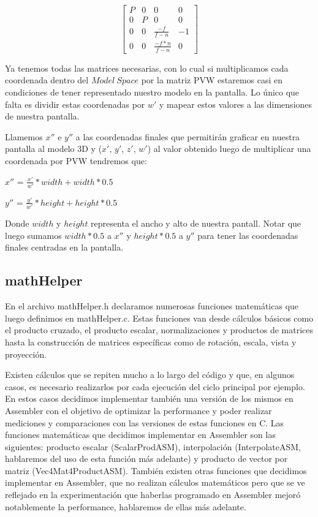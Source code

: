 \documentclass[a4paper]{article}
\begin{document}
\[
\begin{bmatrix}
P & 0 & 0 & 0 \\
0 & P & 0 & 0 \\
0 & 0 & \frac{-f}{f-n} & -1 \\
0 & 0 & \frac{-f*n}{f-n} & 0  
\end{bmatrix}
\]


Ya tenemos todas las matrices necesarias, con lo cual si multiplicamos cada coordenada dentro del $Model \ Space$ por la matriz PVW estaremos casi en condiciones de tener representado nuestro modelo en la pantalla. Lo único que falta es dividir estas coordenadas por $w'$ y mapear estos valores a las dimensiones de nuestra pantalla.\newline


Llamemos $x''$ e $y''$ a las coordenadas finales que permitirán graficar en nuestra pantalla al modelo 3D y ($x'$, $y'$, $z'$, $w'$) al valor obtenido luego de multiplicar una coordenada por PVW tendremos que: \newline

$x''$ = $\frac{x'}{w'}*width +  width*0.5$ \newline

$y''$ = $\frac{y'}{w'}*height +  height*0.5$ \newline

Donde $width$ y $height$ representa el ancho y alto de nuestra pantall. Notar que luego sumamos $width*0.5$ a $x''$ y $height*0.5$ a $y''$ para tener las coordenadas finales centradas en la pantalla.

\subsection{mathHelper}
En el archivo mathHelper.h declaramos numerosas funciones matemáticas que luego definimos en mathHelper.c. Estas funciones van desde cálculos básicos como el producto cruzado, el producto escalar, normalizaciones y productos de matrices hasta la construcción de matrices específicas como de rotación, escala, vista y proyección.
\par Existen cálculos que se repiten mucho a lo largo del código y que, en algunos casos, es necesario realizarlos por cada ejecución del ciclo principal por ejemplo. En estos casos decidimos implementar también una versión de los mismos en Assembler con el objetivo de optimizar la performance y poder realizar mediciones y comparaciones con las versiones de estas funciones en C. Las funciones matemáticas que decidimos implementar en Assembler son las siguientes: producto escalar (ScalarProdASM), interpolación (InterpolateASM, hablaremos del uso de esta función más adelante) y producto de vector por matriz (Vec4Mat4ProductASM). También existen otras funciones que decidimos implementar en Assembler, que no realizan cálculos matemáticos pero que se ve reflejado en la experimentación que haberlas programado en Assembler mejoró notablemente la performance, hablaremos de ellas más adelante.
\end{document}
